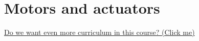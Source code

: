 \part{Motors and actuators}

\href{http://nooooooooooooooo.com/nooo.mp3}{Do we want even more curriculum in this course? (Click me)}
